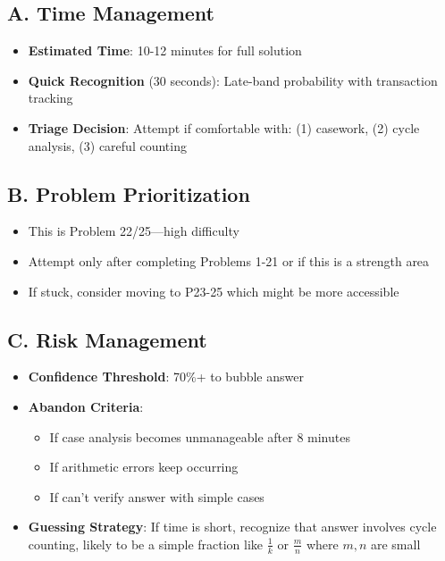 \documentclass[]{article}
\begin{document}
\begin{competitionbox}
\subsection*{A. Time Management}
\begin{itemize}[leftmargin=*]
    \item \textbf{Estimated Time}: 10-12 minutes for full solution
    \item \textbf{Quick Recognition} (30 seconds): Late-band probability with transaction tracking
    \item \textbf{Triage Decision}: Attempt if comfortable with: (1) casework, (2) cycle analysis, (3) careful counting
\end{itemize}

\subsection*{B. Problem Prioritization}
\begin{itemize}[leftmargin=*]
    \item This is Problem 22/25---high difficulty
    \item Attempt only after completing Problems 1-21 or if this is a strength area
    \item If stuck, consider moving to P23-25 which might be more accessible
\end{itemize}

\subsection*{C. Risk Management}
\begin{itemize}[leftmargin=*]
    \item \textbf{Confidence Threshold}: 70\%+ to bubble answer
    \item \textbf{Abandon Criteria}:
    \begin{itemize}
        \item If case analysis becomes unmanageable after 8 minutes
        \item If arithmetic errors keep occurring
        \item If can't verify answer with simple cases
    \end{itemize}
    \item \textbf{Guessing Strategy}: If time is short, recognize that answer involves cycle counting, likely to be a simple fraction like $\frac{1}{k}$ or $\frac{m}{n}$ where $m,n$ are small
\end{itemize}


\end{competitionbox}
\end{document}
